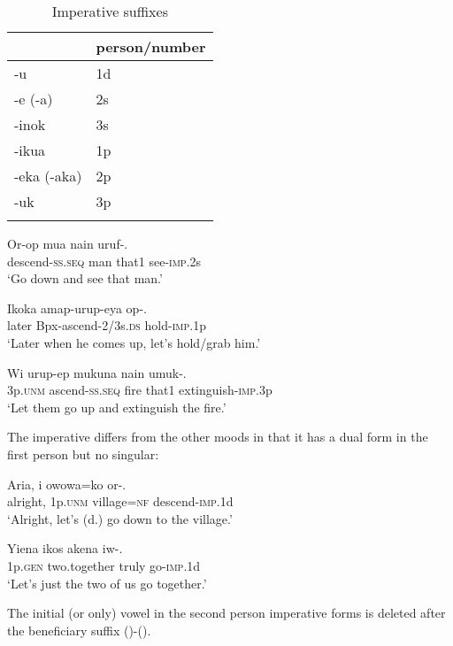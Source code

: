 \begin{table}
\begin{tabular}{ll}
\mytoprule
&person/number \\
\midrule 
-u & 1d\\
-e (-a) & 2s\\
-inok & 3s\\
-ikua & 1p\\
-eka (-aka) & 2p\\
-uk & 3p\\
\mybottomrule
\end{tabular}

\caption{Imperative suffixes}
\label{tab:12}
\end{table}

\ea%
\label{ex:x229}
\gll Or-op mua nain uruf-. \\
descend-\textsc{ss}.\textsc{seq} man that1 see-\textsc{imp}.2s \\
\glt`Go down and see that man.'
\z

\ea%
\label{ex:x1847}
\gll Ikoka amap-urup-eya op-. \\
later Bpx-ascend-2/3s.\textsc{ds} hold-\textsc{imp}.1p\\
\glt`Later when he comes up, let's hold/grab him.'
\z

\ea%
\label{ex:x230}
\gll Wi urup-ep mukuna nain umuk-. \\
3p.\textsc{unm} ascend-\textsc{ss}.\textsc{seq} fire that1 extinguish-\textsc{imp}.3p\\
\glt`Let them go up and extinguish the fire.' 
\z

The imperative differs from the other moods in that it has a dual form in the first person but no singular: 

\ea%
\label{ex:x446}
\gll Aria, i owowa=ko or-. \\
alright, 1p.\textsc{unm} village=\textsc{nf} descend-\textsc{imp}.1d\\
\glt`Alright, let's (d.) go down to the village.'
\z

\ea%
\label{ex:x1196}
\gll Yiena ikos akena iw-. \\
1p.\textsc{gen} two.together truly go-\textsc{imp}.1d\\
\glt`Let's just the two of us go together.'
\z

The initial (or only) vowel in the second person imperative forms is deleted after the beneficiary suffix ()-(). 

